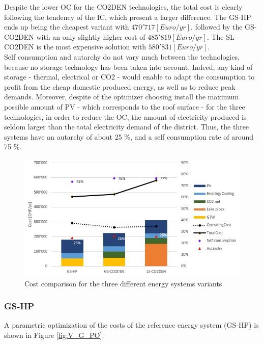 \documentclass{article}
\begin{document}
Despite the lower OC for the CO2DEN technologies, the total cost is clearly following the tendency of the IC, which present a larger difference. The GS-HP ends up being the cheapest variant with $470'717 [Euro/yr]$, followed by the GS-CO2DEN with an only slightly higher cost of $485'819 [Euro/yr]$. The SL-CO2DEN is the most expensive solution with $580'831 [Euro/yr]$.\\

Self consumption and autarchy do not vary much between the technologies, because no storage technology has been taken into account. Indeed, any kind of storage - thermal, electrical or CO2 - would enable to adapt the consumption to profit from the cheap domestic produced energy, as well as to reduce peak demands. Moreover, despite of the optimizer choosing install the maximum possible amount of PV - which corresponds to the roof surface - for the three technologies, in order to reduce the OC, the amount of electricity produced is seldom larger than the total electricity demand of the district. Thus, the three systems have an autarchy of about 25 \%, and a self consumption rate of around 75 \%.


\begin{figure}[htp]
	\centering
	\includegraphics[width=1\textwidth]{V_costs.PNG}
	\caption{Cost comparison for the three different energy systems variants}
	\label{fig:V_costs}
\end{figure}


\subsubsection{GS-HP}
A parametric optimization of the costs of the reference energy system (GS-HP) is shown in Figure \ref{fig:V_G_PO}.
\end{document}
